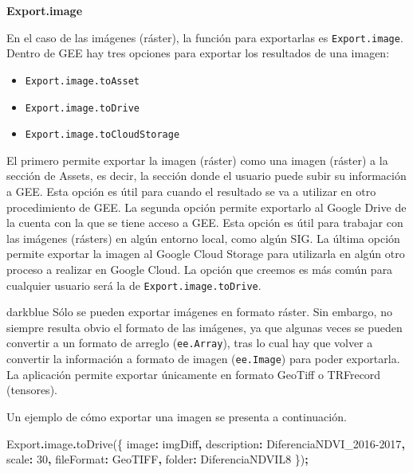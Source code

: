 \documentclass[
  12pt,
  letterpaper,
  twoside]{book}
\newenvironment{Shaded}{\begin{snugshade}}{\end{snugshade}}
\newcommand{\AttributeTok}[1]{\textcolor[rgb]{0.77,0.63,0.00}{#1}}
\newcommand{\DataTypeTok}[1]{\textcolor[rgb]{0.13,0.29,0.53}{#1}}
\newcommand{\DecValTok}[1]{\textcolor[rgb]{0.00,0.00,0.81}{#1}}
\newcommand{\FunctionTok}[1]{\textcolor[rgb]{0.00,0.00,0.00}{#1}}
\newcommand{\NormalTok}[1]{#1}
\newcommand{\OperatorTok}[1]{\textcolor[rgb]{0.81,0.36,0.00}{\textbf{#1}}}
\newcommand{\StringTok}[1]{\textcolor[rgb]{0.31,0.60,0.02}{#1}}
\providecommand{\tightlist}{%
  \setlength{\itemsep}{0pt}\setlength{\parskip}{0pt}}
\begin{document}
\textbf{Export.image}

En el caso de las imágenes (ráster), la función para exportarlas es \texttt{Export.image}. Dentro de GEE hay tres opciones para exportar los resultados de una imagen:

\begin{itemize}
\tightlist
\item
  \texttt{Export.image.toAsset}
\item
  \texttt{Export.image.toDrive}
\item
  \texttt{Export.image.toCloudStorage}
\end{itemize}

El primero permite exportar la imagen (ráster) como una imagen (ráster) a la sección de Assets, es decir, la sección donde el usuario puede subir su información a GEE. Esta opción es útil para cuando el resultado se va a utilizar en otro procedimiento de GEE. La segunda opción permite exportarlo al Google Drive de la cuenta con la que se tiene acceso a GEE. Esta opción es útil para trabajar con las imágenes (rásters) en algún entorno local, como algún SIG. La última opción permite exportar la imagen al Google Cloud Storage para utilizarla en algún otro proceso a realizar en Google Cloud. La opción que creemos es más común para cualquier usuario será la de \texttt{Export.image.toDrive}.

\begin{bluebox2}

\begin{awesomeblock}{5pt}{\faLightbulb}{darkblue}
Sólo se pueden exportar imágenes en formato ráster. Sin embargo, no siempre resulta obvio el formato de las imágenes, ya que algunas veces se pueden convertir a un formato de arreglo (\texttt{ee.Array}), tras lo cual hay que volver a convertir la información a formato de imagen (\texttt{ee.Image}) para poder exportarla. La aplicación permite exportar únicamente en formato GeoTiff o TRFrecord (tensores).

\end{awesomeblock}

\end{bluebox2}

Un ejemplo de cómo exportar una imagen se presenta a continuación.

\begin{Shaded}
\begin{Highlighting}[]
\NormalTok{Export}\OperatorTok{.}\AttributeTok{image}\OperatorTok{.}\FunctionTok{toDrive}\NormalTok{(\{}
  \DataTypeTok{image}\OperatorTok{:}\NormalTok{ imgDiff}\OperatorTok{,}
  \DataTypeTok{description}\OperatorTok{:} \StringTok{\textquotesingle{}DiferenciaNDVI\_2016{-}2017\textquotesingle{}}\OperatorTok{,}
  \DataTypeTok{scale}\OperatorTok{:} \DecValTok{30}\OperatorTok{,}
  \DataTypeTok{fileFormat}\OperatorTok{:} \StringTok{\textquotesingle{}GeoTIFF\textquotesingle{}}\OperatorTok{,}
  \DataTypeTok{folder}\OperatorTok{:} \StringTok{\textquotesingle{}DiferenciaNDVIL8\textquotesingle{}}
\NormalTok{\})}\OperatorTok{;} 
\end{Highlighting}
\end{Shaded}
\end{document}
